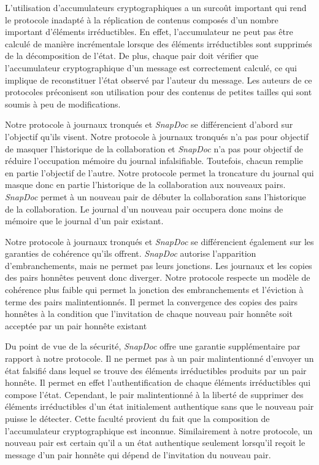 L'utilisation d'accumulateurs cryptographiques a un surcoût important qui rend le protocole inadapté à la réplication de contenus composés d'un nombre important d'éléments irréductibles.
En effet, l'accumulateur ne peut pas être calculé de manière incrémentale lorsque des éléments irréductibles sont supprimés de la décomposition de l'état.
De plus, chaque pair doit vérifier que l'accumulateur cryptographique d'un message est correctement calculé, ce qui implique de reconstituer l'état observé par l'auteur du message.
Les auteurs de ce protocoles préconisent son utilisation pour des contenus de petites tailles qui sont soumis à peu de modifications.

Notre protocole à journaux tronqués et \emph{SnapDoc} se différencient d'abord sur l'objectif qu'ils visent.
Notre protocole à journaux tronqués n'a pas pour objectif de masquer l'historique de la collaboration et \emph{SnapDoc} n'a pas pour objectif de réduire l'occupation mémoire du journal infalsifiable.
Toutefois, chacun remplie en partie l'objectif de l'autre.
Notre protocole permet la troncature du journal qui masque donc en partie l'historique de la collaboration aux nouveaux pairs.
\emph{SnapDoc} permet à un nouveau pair de débuter la collaboration sans l'historique de la collaboration.
Le journal d'un nouveau pair occupera donc moins de mémoire que le journal d'un pair existant.

Notre protocole à journaux tronqués et \emph{SnapDoc} se différencient également sur les garanties de cohérence qu'ils offrent.
\emph{SnapDoc} autorise l'apparition d'embranchements, mais ne permet pas leurs jonctions.
Les journaux et les copies des pairs honnêtes peuvent donc diverger.
Notre protocole respecte un modèle de cohérence plus faible qui permet la jonction des embranchements et l'éviction à terme des pairs malintentionnés.
Il permet la convergence des copies des pairs honnêtes à la condition que l'invitation de chaque nouveau pair honnête soit acceptée par un pair honnête existant

Du point de vue de la sécurité, \emph{SnapDoc} offre une garantie supplémentaire par rapport à notre protocole.
Il ne permet pas à un pair malintentionné d'envoyer un état falsifié dans lequel se trouve des éléments irréductibles produits par un pair honnête.
Il permet en effet l'authentification de chaque éléments irréductibles qui compose l'état.
Cependant, le pair malintentionné à la liberté de supprimer des éléments irréductibles d'un état initialement authentique sans que le nouveau pair puisse le détecter.
Cette faculté provient du fait que la composition de l'accumulateur cryptographique est inconnue.
Similairement à notre protocole, un nouveau pair est certain qu'il a un état authentique seulement lorsqu'il reçoit le message d'un pair honnête qui dépend de l'invitation du nouveau pair.

